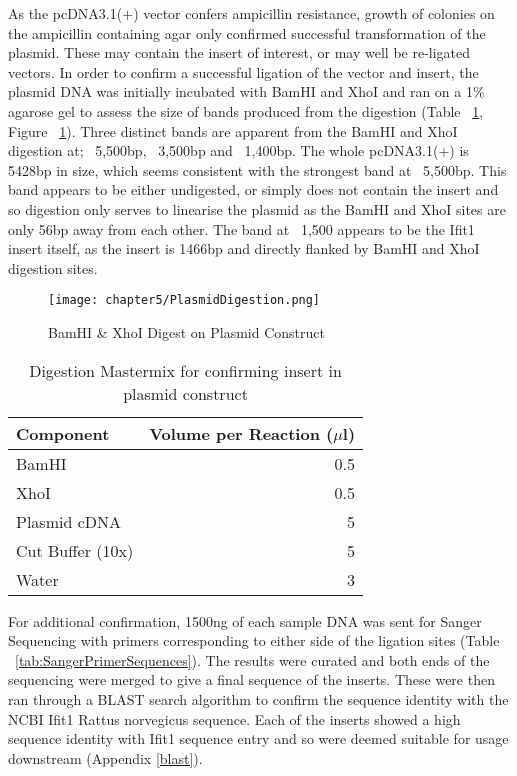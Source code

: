 As the pcDNA3.1($+$) vector confers ampicillin resistance, growth of colonies on the ampicillin containing agar only confirmed successful transformation of the plasmid. These may contain the insert of interest, or may well be re-ligated vectors. In order to confirm a successful ligation of the vector and insert, the plasmid DNA was initially incubated with BamHI and XhoI and ran on a 1\% agarose gel to assess the size of bands produced from the digestion (Table ~\ref{tab:construct_digestion}, Figure ~\ref{tab:construct_digestion}). Three distinct bands are apparent from the BamHI and XhoI digestion at; ~5,500bp, ~3,500bp and ~1,400bp. The whole pcDNA3.1($+$) is 5428bp in size, which seems consistent with the strongest band at ~5,500bp. This band appears to be either undigested, or simply does not contain the insert and so digestion only serves to linearise the plasmid as the BamHI and XhoI sites are only 56bp away from each other. The band at ~1,500 appears to be the Ifit1 insert itself, as the insert is 1466bp and directly flanked by BamHI and XhoI digestion sites. \\

\begin{figure*}[!htbp]
\centering
\texttt{[image: chapter5/PlasmidDigestion.png]}
\caption{BamHI \& XhoI Digest on Plasmid Construct}
\label{fig:plasmid_digest}
\end{figure*}

\begin{table}[h]
\centering
\footnotesize
\begin{tabular}{lr}
  
  Component     & Volume per Reaction ($\mu$l) \\
  \hline
  BamHI         & 0.5  \\
  XhoI          & 0.5  \\
  Plasmid cDNA  & 5  \\
  Cut Buffer (10x) & 5  \\
  Water         & 3  \\
\end{tabular}
\caption{Digestion Mastermix for confirming insert in plasmid construct}
\label{tab:construct_digestion}
\end{table}

For additional confirmation, 1500ng of each sample DNA was sent for Sanger Sequencing with primers corresponding to either side of the ligation sites (Table ~\ref{tab:SangerPrimerSequences}). The results were curated and both ends of the sequencing were merged to give a final sequence of the inserts. These were then ran through a BLAST search algorithm to confirm the sequence identity with the NCBI Ifit1 Rattus norvegicus sequence. Each of the inserts showed a high sequence identity with Ifit1 sequence entry and so were deemed suitable for usage downstream (Appendix \ref{blast}).  \\

